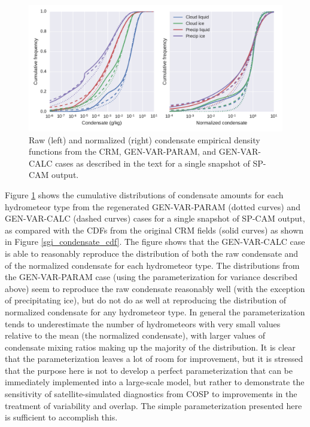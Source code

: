 \begin{figure}
    \centering
    \includegraphics[width=\columnwidth]{graphics/subgrid2_mxratio_cdf2.pdf}
    \caption{Raw (left) and normalized (right) condensate empirical density functions from the CRM, GEN-VAR-PARAM, and GEN-VAR-CALC cases as described in the text for a single snapshot of SP-CAM output.}
    \label{sgi_condensate_cdf2}
\end{figure}

Figure \ref{sgi_condensate_cdf2} shows the cumulative distributions of condensate amounts for each hydrometeor type from the regenerated GEN-VAR-PARAM (dotted curves) and GEN-VAR-CALC (dashed curves) cases for a single snapshot of SP-CAM output, as compared with the CDFs from the original CRM fields (solid curves) as shown in Figure \ref{sgi_condensate_cdf}. The figure shows that the GEN-VAR-CALC case is able to reasonably reproduce the distribution of both the raw condensate and of the normalized condensate for each hydrometeor type. The distributions from the GEN-VAR-PARAM case (using the parameterization for variance described above) seem to reproduce the raw condensate reasonably well (with the exception of precipitating ice), but do not do as well at reproducing the distribution of normalized condensate for any hydrometeor type. In general the parameterization tends to underestimate the number of hydrometeors with very small values relative to the mean (the normalized condensate), with larger values of condensate mixing ratios making up the majority of the distribution. It is clear that the parameterization leaves a lot of room for improvement, but it is stressed that the purpose here is not to develop a perfect parameterization that can be immediately implemented into a large-scale model, but rather to demonstrate the sensitivity of satellite-simulated diagnostics from COSP to improvements in the treatment of variability and overlap. The simple parameterization presented here is sufficient to accomplish this.

